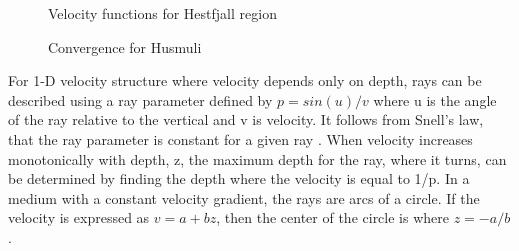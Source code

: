 \documentclass[extra]{gji}
\begin{document}
\begin{figure}
	\caption{
		Velocity functions for Hestfjall region
		}
\end{figure}

\begin{figure}
	\caption{
		Convergence for Husmuli
		}
\end{figure}




For 1-D velocity structure where velocity depends only on depth,
rays can be described using a ray parameter
defined by $ p=sin(u)/v $ where u is the angle of the ray relative to the
vertical and v is velocity. It follows from Snell's law, that the ray
parameter is constant for a given ray \citep{telf}.
When velocity increases
monotonically with depth, z, the maximum depth for the ray, where it
turns, can be determined by finding the depth where the velocity is
equal to 1/p. In a medium with a constant velocity gradient, the rays
are arcs of a circle. If the velocity is expressed as $v = a + bz$, then the
center of the circle is where $z = -a/b$.
\end{document}
